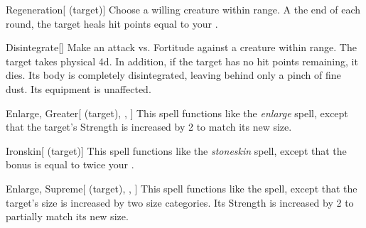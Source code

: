 \lowercase{\hypertarget{spell:Regeneration}{}}\label{spell:Regeneration}
\begin{attuneability}[\nth{4}]{\hypertarget{spell:Regeneration}{Regeneration}}[ (target)]
Choose a willing creature within \rngclose range.
A the end of each round, the target heals hit points equal to your .
\end{attuneability}
\vspace{0.25em}



\lowercase{\hypertarget{spell:Disintegrate}{}}\label{spell:Disintegrate}
\begin{apability}[\nth{5}]{\hypertarget{spell:Disintegrate}{Disintegrate}}[]
Make an attack vs. Fortitude against a creature within \rngmed range.
\hit The target takes physical  \plus4d.
In addition, if the target has no hit points remaining, it dies.
Its body is completely disintegrated, leaving behind only a pinch of fine dust.
Its equipment is unaffected.
\end{apability}
\vspace{0.25em}



\lowercase{\hypertarget{spell:Enlarge, Greater}{}}\label{spell:Enlarge, Greater}
\begin{attuneability}[\nth{5}]{\hypertarget{spell:Enlarge, Greater}{Enlarge, Greater}}[ (target), , ]
This spell functions like the \textit{enlarge} spell, except that the target's Strength is increased by 2 to match its new size.
\end{attuneability}
\vspace{0.25em}



\lowercase{\hypertarget{spell:Ironskin}{}}\label{spell:Ironskin}
\begin{attuneability}[\nth{6}]{\hypertarget{spell:Ironskin}{Ironskin}}[ (target)]
This spell functions like the \textit{stoneskin} spell, except that the bonus is equal to twice your .
\end{attuneability}
\vspace{0.25em}



\lowercase{\hypertarget{spell:Enlarge, Supreme}{}}\label{spell:Enlarge, Supreme}
\begin{attuneability}[\nth{7}]{\hypertarget{spell:Enlarge, Supreme}{Enlarge, Supreme}}[ (target), , ]
This spell functions like the  spell, except that the target's size is increased by two size categories.
Its Strength is increased by 2 to partially match its new size.
\end{attuneability}
\vspace{0.25em}



